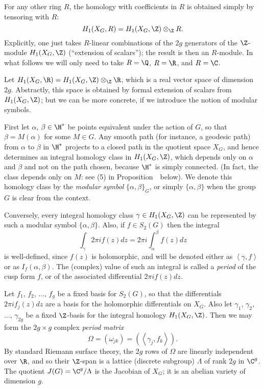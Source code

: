 For any other ring $R$, the homology with coefficients in $R$ is
obtained simply by tensoring with $R$: $$ H_1(X_G,R) =
H_1(X_G,\Z)\otimes_{\Z}R.  $$ Explicitly, one just takes $R$-linear
combinations of the $2g$ generators of the $\Z$-module $H_1(X_G,\Z)$
(``extension of scalars''); the result is then an $R$-module.  In what
follows we will only need to take $R=\Q$, $R=\R$, and $R=\C$.

Let $H_1(X_G,\R) = H_1(X_G,\Z)\otimes_{\Z}\R$, which is a real
vector space of dimension $2g$.  Abstractly, this space is obtained by
formal extension of scalars from $H_1(X_G,\Z)$; but we can be more
concrete, if we introduce the notion of modular symbols.

\newprop{\modsymbasics}
First let $\alpha$, $\beta\in\H^*$ be points equivalent under the
action of $G$, so that $\beta=M(\alpha)$ for some $M\in G$.  Any
smooth path (for instance, a geodesic path) from $\alpha$ to $\beta$
in $\H^*$ projects to a closed path in the quotient space $X_G$, and
hence determines an integral homology class in $H_1(X_G,\Z)$, which
depends only on $\alpha$ and $\beta$ and not on the path chosen,
because $\H^*$ is simply connected.  (In fact, the class depends only
on $M$: see (5) in Proposition~\modsymbasics\ below). We denote this
homology class by the {\it modular symbol\/} $\{\alpha,\beta\}_G$, or
simply $\{\alpha,\beta\}$ when the group $G$ is clear from the
context.

Conversely, every integral homology class $\gamma\in H_1(X_G,\Z)$ can
be represented by such a modular symbol $\{\alpha,\beta\}$.  Also, if
$f\in S_2(G)$ then the integral 
$$ 
  \int_{\gamma}2\pi if(z)dz = 2\pi i\int_{\alpha}^{\beta}f(z)dz 
$$ 
is well-defined, since $f(z)$ is holomorphic, and will be denoted
either as $\left<\gamma,f\right>$ or as $I_f(\alpha,\beta)$.  The
(complex) value of such an integral is called a {\it period\/} of the
cusp form $f$, or of the associated differential $2\pi if(z)dz$.
 
Let $f_1$, $f_2$, $\ldots$, $f_g$ be a fixed basis for $S_2(G)$, so
that the differentials $2\pi if_j(z)dz$ are a basis for the
holomorphic differentials on $X_G$.  Also let $\gamma_1$, $\gamma_2$,
$\ldots$, $\gamma_{2g}$ be a fixed $\Z$-basis for the integral
homology $H_1(X_G,\Z)$.  Then we may form the $2g\times g$ complex 
{\it period matrix}
$$
  \Omega = \left(\omega_{jk}\right) = \left(\left<\gamma_j,f_k\right>\right).
$$
By standard Riemann surface theory, the $2g$ rows of $\Omega$ are linearly
independent over $\R$, and so their $\Z$-span is a lattice (discrete subgroup)
$\Lambda$ of rank $2g$ in $\C^g$.  The quotient $J(G)=\C^g/\Lambda$ is
the Jacobian of $X_G$; it is an abelian variety of dimension $g$.

